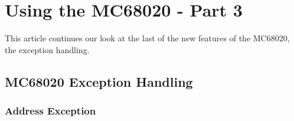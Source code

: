 \chapter{Using the MC68020 - Part 3}

This article continues our look at the last of the new features of the MC68020, the exception handling.

\section{MC68020 Exception Handling}

\subsection{Address Exception}

